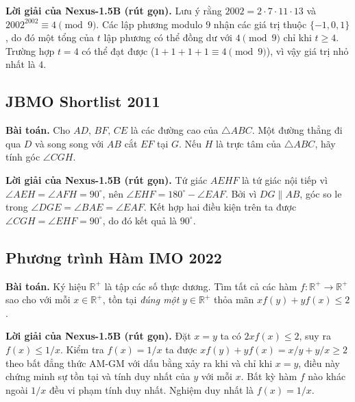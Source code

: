 \documentclass[11pt,a4paper]{article}
\begin{document}
\textbf{Lời giải của Nexus-1.5B (rút gọn).} Lưu ý rằng
\(2002=2\cdot 7\cdot 11\cdot 13\) và \(2002^{2002}\equiv 4\pmod 9\). Các lập phương modulo
\(9\) nhận các giá trị thuộc \(\{-1,0,1\}\), do đó một tổng của \(t\) lập phương có thể đồng dư với
\(4\pmod 9\) chỉ khi \(t\ge 4\). Trường hợp \(t=4\) có thể đạt được
(\(1+1+1+1\equiv 4\pmod 9\)), vì vậy giá trị nhỏ nhất là \(\boxed{4}\).

\subsection{JBMO Shortlist 2011}

\textbf{Bài toán.} Cho \(AD,\,BF,\,CE\) là các đường cao của \(\triangle ABC\). Một đường thẳng
đi qua \(D\) và song song với \(AB\) cắt \(EF\) tại \(G\). Nếu \(H\) là trực tâm
của \(\triangle ABC\), hãy tính góc \(\angle CGH\).

\textbf{Lời giải của Nexus-1.5B (rút gọn).} Tứ giác \(AEHF\) là tứ giác nội tiếp vì
\(\angle AEH=\angle AFH=90^\circ\), nên \(\angle EHF=180^\circ-\angle EAF\). Bởi vì
\(DG\parallel AB\), góc so le trong \(\angle DGE=\angle BAE=\angle EAF\).
Kết hợp hai điều kiện trên ta được \(\angle CGH=\angle EHF=90^\circ\), do đó kết quả là
\(\boxed{90^\circ}\).

\subsection{Phương trình Hàm IMO 2022}

\textbf{Bài toán.} Ký hiệu \(\mathbb{R}^+\) là tập các số thực dương. Tìm tất cả các hàm
\(f:\mathbb{R}^+\to\mathbb{R}^+\) sao cho với mỗi \(x\in\mathbb{R}^+\), tồn tại
\emph{đúng một} \(y\in\mathbb{R}^+\) thỏa mãn \(xf(y)+yf(x)\le 2\).

\textbf{Lời giải của Nexus-1.5B (rút gọn).} Đặt \(x=y\) ta có \(2xf(x)\le 2\), suy ra
\(f(x)\le 1/x\). Kiểm tra \(f(x)=1/x\) ta được \(xf(y)+yf(x)=x/y+y/x\ge 2\) theo bất đẳng thức AM-GM
với dấu bằng xảy ra khi và chỉ khi \(x=y\), điều này chứng minh sự tồn tại và tính duy nhất của \(y\) với mỗi
\(x\). Bất kỳ hàm \(f\) nào khác ngoài \(1/x\) đều vi phạm tính duy nhất. Nghiệm duy nhất là
\(\boxed{f(x)=1/x}\).
\end{document}
